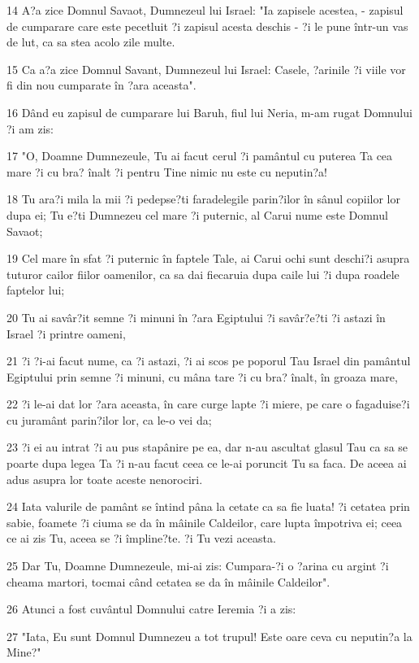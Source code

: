 \par 14 A?a zice Domnul Savaot, Dumnezeul lui Israel: "Ia zapisele acestea, - zapisul de cumparare care este pecetluit ?i zapisul acesta deschis - ?i le pune într-un vas de lut, ca sa stea acolo zile multe.
\par 15 Ca a?a zice Domnul Savant, Dumnezeul lui Israel: Casele, ?arinile ?i viile vor fi din nou cumparate în ?ara aceasta".
\par 16 Dând eu zapisul de cumparare lui Baruh, fiul lui Neria, m-am rugat Domnului ?i am zis:
\par 17 "O, Doamne Dumnezeule, Tu ai facut cerul ?i pamântul cu puterea Ta cea mare ?i cu bra? înalt ?i pentru Tine nimic nu este cu neputin?a!
\par 18 Tu ara?i mila la mii ?i pedepse?ti faradelegile parin?ilor în sânul copiilor lor dupa ei; Tu e?ti Dumnezeu cel mare ?i puternic, al Carui nume este Domnul Savaot;
\par 19 Cel mare în sfat ?i puternic în faptele Tale, ai Carui ochi sunt deschi?i asupra tuturor cailor fiilor oamenilor, ca sa dai fiecaruia dupa caile lui ?i dupa roadele faptelor lui;
\par 20 Tu ai savâr?it semne ?i minuni în ?ara Egiptului ?i savâr?e?ti ?i astazi în Israel ?i printre oameni,
\par 21 ?i ?i-ai facut nume, ca ?i astazi, ?i ai scos pe poporul Tau Israel din pamântul Egiptului prin semne ?i minuni, cu mâna tare ?i cu bra? înalt, în groaza mare,
\par 22 ?i le-ai dat lor ?ara aceasta, în care curge lapte ?i miere, pe care o fagaduise?i cu juramânt parin?ilor lor, ca le-o vei da;
\par 23 ?i ei au intrat ?i au pus stapânire pe ea, dar n-au ascultat glasul Tau ca sa se poarte dupa legea Ta ?i n-au facut ceea ce le-ai poruncit Tu sa faca. De aceea ai adus asupra lor toate aceste nenorociri.
\par 24 Iata valurile de pamânt se întind pâna la cetate ca sa fie luata! ?i cetatea prin sabie, foamete ?i ciuma se da în mâinile Caldeilor, care lupta împotriva ei; ceea ce ai zis Tu, aceea se ?i împline?te. ?i Tu vezi aceasta.
\par 25 Dar Tu, Doamne Dumnezeule, mi-ai zis: Cumpara-?i o ?arina cu argint ?i cheama martori, tocmai când cetatea se da în mâinile Caldeilor".
\par 26 Atunci a fost cuvântul Domnului catre Ieremia ?i a zis:
\par 27 "Iata, Eu sunt Domnul Dumnezeu a tot trupul! Este oare ceva cu neputin?a la Mine?"
